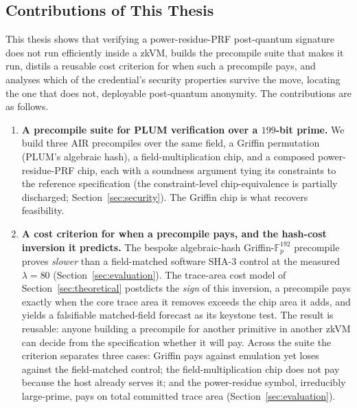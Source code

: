 \subsection{Contributions of This Thesis}
This thesis shows that verifying a power-residue-PRF post-quantum signature does not run efficiently inside a zkVM, builds the precompile suite that makes it run, distils a reusable cost criterion for when such a precompile pays, and analyses which of the credential's security properties survive the move, locating the one that does not, deployable post-quantum anonymity. The contributions are as follows.

\begin{enumerate}
  \item \textbf{A precompile suite for PLUM verification over a $199$-bit prime.} We build three AIR precompiles over the same field, a Griffin permutation (PLUM's algebraic hash), a field-multiplication chip, and a composed power-residue-PRF chip, each with a soundness argument tying its constraints to the reference specification (the constraint-level chip-equivalence is partially discharged; Section~\ref{sec:security}). The Griffin chip is what recovers feasibility.

  \item \textbf{A cost criterion for when a precompile pays, and the hash-cost inversion it predicts.} The bespoke algebraic-hash Griffin-$\mathbb{F}_p^{192}$ precompile~\cite{cryptoeprint:2022/403} proves \emph{slower} than a field-matched software SHA-3 control at the measured $\lambda{=}80$ (Section~\ref{sec:evaluation}). The trace-area cost model of Section~\ref{sec:theoretical} postdicts the \emph{sign} of this inversion, a precompile pays exactly when the core trace area it removes exceeds the chip area it adds, and yields a falsifiable matched-field forecast as its keystone test. The result is reusable: anyone building a precompile for another primitive in another zkVM can decide from the specification whether it will pay. Across the suite the criterion separates three cases: Griffin pays against emulation yet loses against the field-matched control; the field-multiplication chip does not pay because the host already serves it; and the power-residue symbol, irreducibly large-prime, pays on total committed trace area (Section~\ref{sec:evaluation}).


\end{enumerate}
